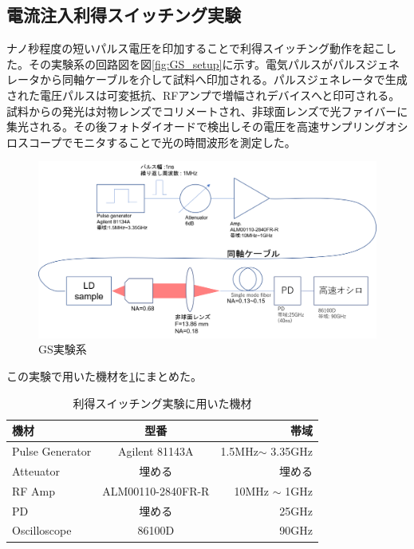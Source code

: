 \subsection{電流注入利得スイッチング実験}%
ナノ秒程度の短いパルス電圧を印加することで利得スイッチング動作を起こした。その実験系の回路図を図\ref{fig:GS_setup}に示す。電気パルスがパルスジェネレータから同軸ケーブルを介して試料へ印加される。パルスジェネレータで生成された電圧パルスは可変抵抗、RFアンプで増幅されデバイスへと印可される。試料からの発光は対物レンズでコリメートされ、非球面レンズで光ファイバーに集光される。その後フォトダイオードで検出しその電圧を高速サンプリングオシロスコープでモニタすることで光の時間波形を測定した。
\begin{figure}[htbp]
	\includegraphics[width=15cm]{figure/fig_2_2_GS_setup.png}
	\caption{GS実験系}
	\label{fig:fig_2_3_GS_setup}
\end{figure}
この実験で用いた機材を\ref{table:table_2_2_GS_setup}にまとめた。
\begin{table}[hbtp]
  \caption{利得スイッチング実験に用いた機材}
  \label{table:table_2_2_GS_setup}
  \centering
  \begin{tabular}{lcr}
    \hline
    機材  & 型番   & 帯域  \\
    \hline \hline
    Pulse Generator  & Agilent 81143A & 1.5MHz$\sim$ 3.35GHz   \\
    Atteuator  &  埋める    & 埋める\\
    RF Amp & ALM00110-2840FR-R & 10MHz $\sim$ 1GHz \\
    PD & 埋める　& 25GHz \\
    Oscilloscope  &  86100D & 90GHz  \\
       \hline
  \end{tabular}
\end{table}
